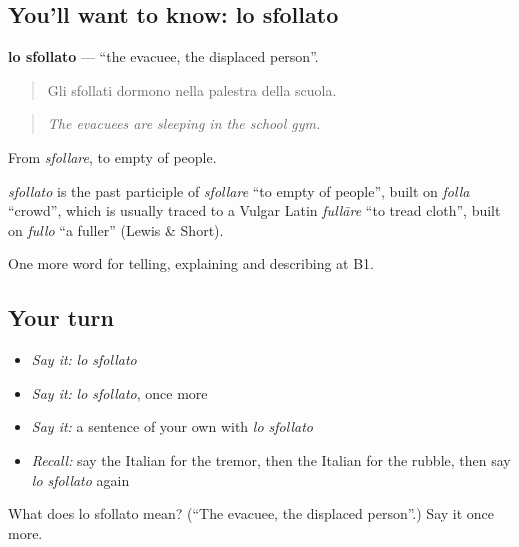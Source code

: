 \subsection*{You'll want to know: lo sfollato}
\textbf{lo sfollato} — \textquotedblleft{}the evacuee, the displaced person\textquotedblright{}.

\begin{quote}
Gli sfollati dormono nella palestra della scuola.
\end{quote}

\begin{quote}
\emph{The evacuees are sleeping in the school gym.}
\end{quote}

From \emph{sfollare}, to empty of people.

\begin{cousinweb}
\emph{sfollato} is the past participle of \emph{sfollare} \textquotedblleft{}to empty of people\textquotedblright{}, built on \emph{folla} \textquotedblleft{}crowd\textquotedblright{}, which is usually traced to a Vulgar Latin \emph{fullāre} \textquotedblleft{}to tread cloth\textquotedblright{}, built on \emph{fullo} \textquotedblleft{}a fuller\textquotedblright{} (Lewis \& Short).
\end{cousinweb}

\begin{grammarlens}[title={What you've built}]
One more word for telling, explaining and describing at B1.
\end{grammarlens}

\subsection*{Your turn}
\begin{itemize}
\raggedright
  \item \emph{Say it:} \emph{lo sfollato}
  \item \emph{Say it:} \emph{lo sfollato}, once more
  \item \emph{Say it:} a sentence of your own with \emph{lo sfollato}
  \item \emph{Recall:} say the Italian for the tremor, then the Italian for the rubble, then say \emph{lo sfollato} again
\end{itemize}

\begin{tcolorbox}[breakable,colback=teal!4,colframe=teal!35!black,title={Before you move on}]
What does lo sfollato mean? (\textquotedblleft{}The evacuee, the displaced person\textquotedblright{}.) Say it once more.
\end{tcolorbox}
